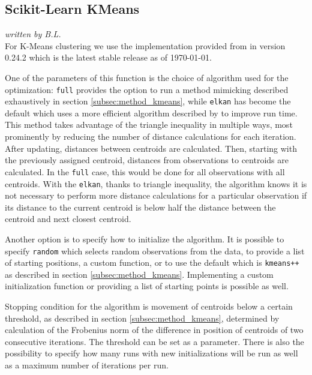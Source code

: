 \subsection{Scikit-Learn KMeans}
\label{subsec:sklearn_kmeans}
\textit{written by B.L.}\\

For K-Means clustering we use the implementation provided from \cite{sklearn_api} in version 0.24.2 which is the latest stable release as of \today. 

One of the parameters of this function is the choice of algorithm used for the optimization: \texttt{full} provides the option to run a method mimicking \cite{lloyd1982least} described exhaustively in section \ref{subsec:method_kmeans}, while \texttt{elkan} has become the default which uses a more efficient algorithm described by \cite{elkan2003using} to improve run time. This method takes advantage of the triangle inequality in multiple ways, most prominently by reducing the number of distance calculations for each iteration. After updating, distances between centroids are calculated. Then, starting with the previously assigned centroid, distances from observations to centroids are calculated. In the \texttt{full} case, this would be done for all observations with all centroids. With the \texttt{elkan}, thanks to triangle inequality, the algorithm knows it is not necessary to perform more distance calculations for a particular observation if its distance to the current centroid is below half the distance between the centroid and next closest centroid.

Another option is to specify how to initialize the algorithm. It is possible to specify \texttt{random} which selects random observations from the data, to provide a list of starting positions, a custom function, or to use the default which is \texttt{kmeans++} as described in section \ref{subsec:method_kmeans}. Implementing a custom initialization function or providing a list of starting points is possible as well.

Stopping condition for the algorithm is movement of centroids below a certain threshold, as described in section \ref{subsec:method_kmeans}, determined by calculation of the Frobenius norm of the difference in position of centroids of two consecutive iterations. The threshold can be set as a parameter. There is also the possibility to specify how many runs with new initializations will be run as well as a maximum number of iterations per run.

